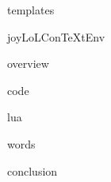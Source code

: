 
\usemodule[t-diSimp]

\startDiSimpComponent templates

\diSimpEnvironment joyLoLConTeXtEnv

\startJoyLoLCoAlg[title=Templates][templates]

\diSimpComponent overview

\diSimpComponent code

\diSimpComponent lua

\diSimpComponent words

\diSimpComponent conclusion

\stopJoyLoLCoAlg

\stopDiSimpComponent
